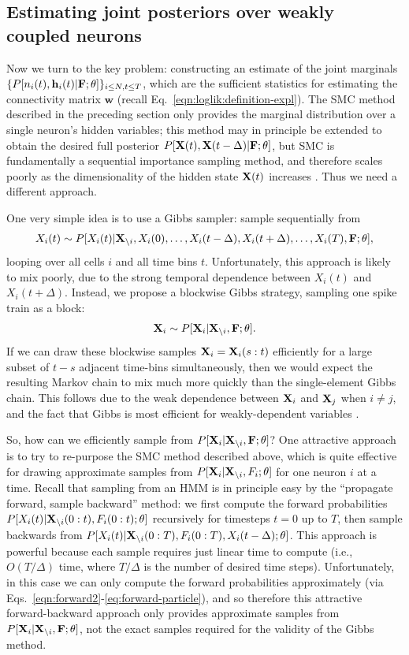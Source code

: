 \documentclass[aoas,preprint]{imsart}
\renewcommand{\i}{\backslash i}
\newcommand{\bth}{\mathbf{\theta}}
\newcommand{\w}{w}
\newcommand{\bw}{\mathbf{\w}}
\newcommand{\bF}{{\bf F}}
\newcommand{\bX}{{\bf X}}
\newcommand{\bh}{\mathbf{h}}
\begin{document}
\subsection{Estimating joint posteriors over weakly coupled neurons}
\label{sec:methods:joint}

Now we turn to the key problem: constructing an estimate of the joint
marginals $\{P[n_i(t), \bh_i(t) | \bF; \bth]\}_{i\leq N,
t\leq T}$, which are the sufficient statistics for estimating the
connectivity matrix $\bw$ (recall
Eq.~\eqref{eqn:loglik:definition-expl}). The SMC method described in
the preceding section only provides the marginal distribution over a
single neuron's hidden variables; this method may in principle be
extended to obtain the desired full posterior $P[\bX(t), \bX(t-\Delta)
| \bF; \bth]$, but SMC is fundamentally a sequential importance
sampling method, and therefore scales poorly as the dimensionality of
the hidden state $\bX(t)$ increases \cite{BickelBengtsson08}. Thus we
need a different approach.

One very simple idea is to use a Gibbs sampler: sample sequentially
from
\begin{align}
X_i(t) \sim P[X_i(t) | \bX_{\i}, X_i(0), \ldots, X_i(t-\Delta),
 X_i(t+\Delta), \ldots, X_i(T), \bF; \bth],
\end{align}
looping over all cells $i$ and all time bins $t$. Unfortunately, this approach is likely to mix poorly, due to the strong temporal dependence between $X_i(t)$ and $X_i(t+\Delta)$. Instead, we propose a blockwise Gibbs strategy, sampling one spike train as a block:
\begin{align}
	\bX_i \sim P[\bX_i | \bX_{\i}, \bF; \bth].
\end{align}
If we can draw these blockwise samples $\bX_i = \bX_i(s:t)$
efficiently for a large subset of $t-s$ adjacent time-bins
simultaneously, then we would expect the resulting Markov chain to mix
much more quickly than the single-element Gibbs chain.  This follows
due to the weak dependence between $\bX_i$ and $\bX_j$ when $i\neq j$,
and the fact that Gibbs is most efficient for weakly-dependent
variables \cite{RC05}.

So, how can we efficiently sample from $P[\bX_i | \bX_{\i}, \bF;
\bth]$? One attractive approach is to try to re-purpose the SMC method
described above, which is quite effective for drawing approximate
samples from $P[\bX_i | \bX_{\i}, F_i; \bth]$ for one neuron $i$ at a
time. Recall that sampling from an HMM is in principle easy by the
``propagate forward, sample backward'' method: we first compute the
forward probabilities $P[X_i(t) | \bX_{\i}(0:t), F_i(0:t); \bth]$
recursively for timesteps $t=0$ up to $T$, then sample backwards from
$P[X_i(t) | \bX_{\i}(0:T), F_i(0:T), X_i(t-\Delta); \bth]$. This
approach is powerful because each sample requires just linear time to
compute (i.e., $O(T/\Delta)$ time, where $T/\Delta$ is the number of
desired time steps). Unfortunately, in this case we can only compute
the forward probabilities approximately (via
Eqs.~\ref{eqn:forward2}-\ref{eq:forward-particle}), and so therefore
this attractive forward-backward approach only provides approximate
samples from $P[\bX_i | \bX_{\i}, \bF; \bth]$, not the exact samples
required for the validity of the Gibbs method.
\end{document}
